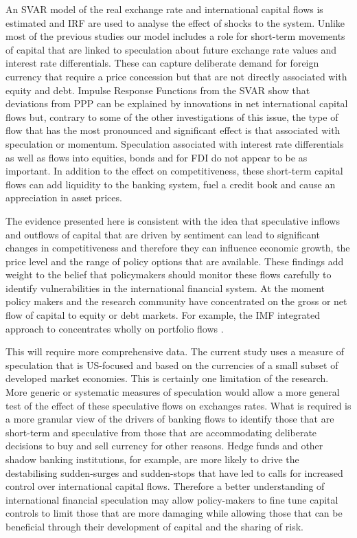 \documentclass[jrfm,article,accept,moreauthors,pdftex]{Definitions/mdpi}
\begin{document}
An SVAR model of the real exchange rate and international capital flows is estimated and IRF are used to analyse the effect of shocks to the system.   Unlike most of the previous studies our model includes a role for short-term movements of capital that are linked to speculation about future exchange rate values and interest rate differentials.  These can capture deliberate demand for foreign currency that require a price concession but that are not directly associated with equity and debt. Impulse Response Functions from the SVAR show that deviations from PPP can be explained by innovations in net international capital flows but, contrary to some of the other investigations of this issue, the type of flow that has the most pronounced and significant effect is that associated with speculation or momentum. Speculation associated with interest rate differentials as well as flows into equities, bonds and for FDI do not appear to be as important. In addition to the effect on competitiveness, these short-term capital flows can add liquidity to the banking system, fuel a credit book and cause an appreciation in asset prices. 

The evidence presented here is consistent with the idea that speculative inflows and outflows of capital that are driven by sentiment can lead to significant changes in competitiveness and therefore they can influence economic growth, the price level and the range of policy options that are available.  These findings add weight to the belief that policymakers should monitor these flows carefully to identify vulnerabilities in the international financial system. At the moment policy makers and the research community have concentrated on the gross or net flow of capital to equity or debt markets.  For example, the IMF integrated approach to concentrates wholly on portfolio flows \citep{IMFflow}. 

This will require more comprehensive data.  The current study uses a measure of speculation that is US-focused and based on the currencies of a small subset of developed market economies. This is certainly one limitation of the research. More generic or systematic measures of speculation would allow a more general test of the effect of these speculative flows on exchanges rates.  What is required is a more granular view of the drivers of banking flows to identify those that are short-term and speculative from those that are accommodating deliberate decisions to buy and sell currency for other reasons.  Hedge funds and other shadow banking institutions, for example, are more likely to drive the destabilising {sudden-surges} and {sudden-stops} that have led to calls for increased control over international capital flows.  Therefore a better understanding of international financial speculation may allow policy-makers to fine tune capital controls to limit those that are more damaging while allowing those that can be beneficial through their development of capital and the sharing of risk.  
\end{document}
